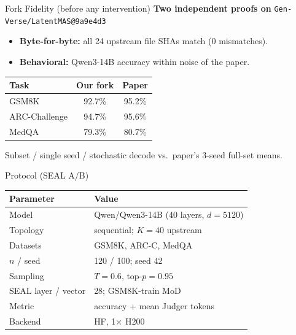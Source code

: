 \documentclass{beamer}
\begin{document}
\begin{frame}{Fork Fidelity (before any intervention)}
    \textbf{Two independent proofs on} \texttt{Gen-Verse/LatentMAS@9a9e4d3}
    \begin{itemize}
        \item \textbf{Byte-for-byte:} all 24 upstream file SHAs match (0 mismatches).
        \item \textbf{Behavioral:} Qwen3-14B accuracy within noise of the paper.
    \end{itemize}
    \vspace{0.15cm}
    \begin{table}
        \centering\small
        \begin{tabular}{lcc}
            \toprule
            Task & Our fork & Paper \\
            \midrule
            GSM8K & 92.7\% & 95.2\% \\
            ARC-Challenge & 94.7\% & 95.6\% \\
            MedQA & 79.3\% & 80.7\% \\
            \bottomrule
        \end{tabular}
    \end{table}
    \vspace{0.1cm}
    \begin{center}\footnotesize Subset / single seed / stochastic decode vs.\ paper's 3-seed full-set means.\end{center}
\end{frame}

\begin{frame}{Protocol (SEAL A/B)}
    \begin{table}
        \centering\small
        \begin{tabular}{ll}
            \toprule
            Parameter & Value \\
            \midrule
            Model & Qwen/Qwen3-14B (40 layers, $d{=}5120$) \\
            Topology & sequential; $K{=}40$ upstream \\
            Datasets & GSM8K, ARC-C, MedQA \\
            $n$ / seed & 120 / 100; seed 42 \\
            Sampling & $T{=}0.6$, top-$p{=}0.95$ \\
            SEAL layer / vector & 28; GSM8K-train MoD \\
            Metric & accuracy + mean Judger tokens \\
            Backend & HF, 1$\times$ H200 \\
            \bottomrule
        \end{tabular}
    \end{table}
\end{frame}
\end{document}

